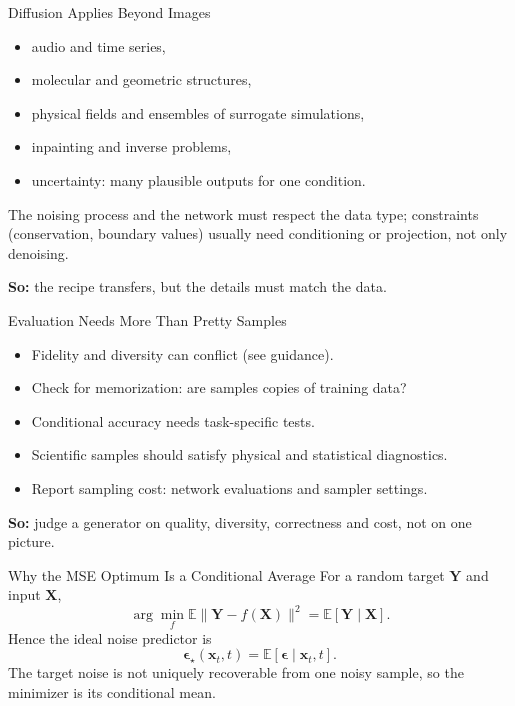 \documentclass{ntuabeamer}
\begin{document}
\begin{frame}{Diffusion Applies Beyond Images}
  \begin{itemize}
    \item audio and time series,
    \item molecular and geometric structures,
    \item physical fields and ensembles of surrogate simulations,
    \item inpainting and inverse problems,
    \item uncertainty: many plausible outputs for one condition.
  \end{itemize}
  The noising process and the network must respect the data type; constraints (conservation,
  boundary values) usually need conditioning or projection, not only denoising.

  \medskip
  \textbf{So:} the recipe transfers, but the details must match the data.
\end{frame}

\begin{frame}{Evaluation Needs More Than Pretty Samples}
  \begin{itemize}
    \item Fidelity and diversity can conflict (see guidance).
    \item Check for memorization: are samples copies of training data?
    \item Conditional accuracy needs task-specific tests.
    \item Scientific samples should satisfy physical and statistical diagnostics.
    \item Report sampling cost: network evaluations and sampler settings.
  \end{itemize}
  \textbf{So:} judge a generator on quality, diversity, correctness and cost, not on one picture.
\end{frame}

\appendix
{}

\begin{frame}{Why the MSE Optimum Is a Conditional Average}
  For a random target \(\mathbf Y\) and input \(\mathbf X\),
  \[
    \arg\min_f\mathbb E\|\mathbf Y-f(\mathbf X)\|^2=\mathbb E[\mathbf Y\mid\mathbf X].
  \]
  Hence the ideal noise predictor is
  \[
    \boldsymbol\epsilon_\star(\mathbf x_t,t)=\mathbb E[\boldsymbol\epsilon\mid\mathbf x_t,t].
  \]
  The target noise is not uniquely recoverable from one noisy sample, so the minimizer is its conditional mean.
\end{frame}
\end{document}
